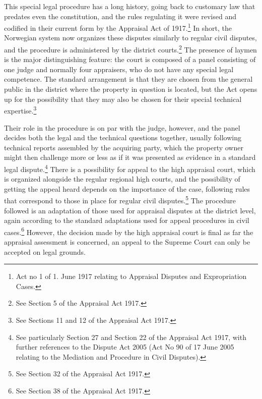 \documentclass[10pt]{article} %
\begin{document}
This special legal procedure has a long history, going back to customary law that predates even the constitution, and the rules regulating it were revised and codified in their current form by the Appraisal Act of 1917.\footnote{Act no 1 of 1. June 1917 relating to Appraisal Disputes and Expropriation Cases.} In short, the Norwegian system now organizes these disputes similarly to regular civil disputes, and the procedure is administered by the district courts.\footnote{See Section 5 of the Appraisal Act 1917.} The presence of laymen is the major distinguishing feature: the court is composed of a panel consisting of one judge and normally four appraisers, who do not have any special legal competence. The standard arrangement is that they are chosen from the general public in the district where the property in question is located, but the Act opens up for the possibility that they may also be chosen for their special technical expertise.\footnote{See Sections 11 and 12 of the Appraisal Act 1917.}

Their role in the procedure is on par with the judge, however, and the panel decides both the legal and the technical questions together, usually following technical reports assembled by the acquiring party, which the property owner might then challenge more or less as if it was presented as evidence in a standard legal dispute.\footnote{See particularly Section 27 and Section 22 of the Appraisal Act 1917, with further references to the Dispute Act 2005 (Act No 90 of 17 June 2005 relating to the Mediation and Procedure in Civil Disputes).}
There is a possibility for appeal to the high appraisal court, which is organized alongside the regular regional high courts, and the possibility of getting the appeal heard depends on the importance of the case, following rules that correspond to those in place for regular civil disputes.\footnote{See Section 32 of the Appraisal Act 1917.} The procedure followed is an adaptation of those used for appraisal disputes at the district level, again according to the standard adaptations used for appeal procedures in civil cases.\footnote{See Section 38 of the Appraisal Act 1917.} However, the decision made by the high appraisal court is final as far the appraisal assessment is concerned, an appeal to the Supreme Court can only be accepted on legal grounds.
\end{document}
